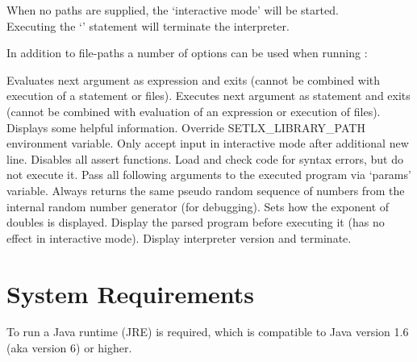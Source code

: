 When no paths are supplied, the `interactive mode' will be started.\\
Executing the `' statement will terminate the interpreter.


In addition to file-paths a number of options can be used when running \setlX{}:

\begin{itemize}
	      {Evaluates next argument as expression and exits (cannot be combined with execution of a statement or files).}
	      {Executes next argument as statement and exits (cannot be combined with evaluation of an expression or execution of files).}
	      {Displays some helpful information.}
	      {Override SETLX\_LIBRARY\_PATH environment variable.}
	      {Only accept input in interactive mode after additional new line.}
	      {Disables all assert functions.}
	      {Load and check code for syntax errors, but do not execute it.}
	      {Pass all following arguments to the executed program via `params' variable.}
	      {Always returns the same pseudo random sequence of numbers from the internal random number generator (for debugging).}
           {Sets how the exponent of doubles is displayed.}
           {Display the parsed program before executing it (has no effect in interactive mode).}
           {Display interpreter version and terminate.}
\end{itemize}

\section{System Requirements}

To run \setlX{} a Java runtime (JRE) is required, which is compatible to Java version 1.6 (aka version 6) or higher.

